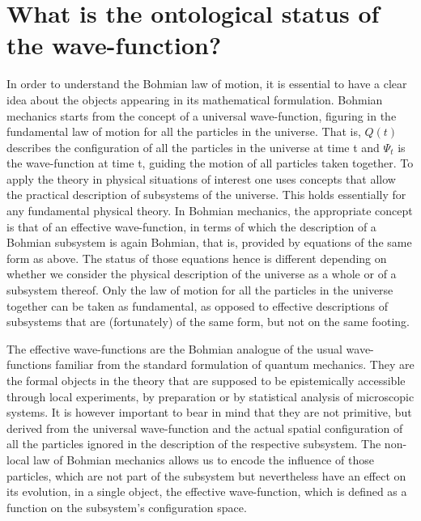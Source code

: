 \documentclass[12pt]{article}
\theoremstyle{definition}
\begin{document}
\section{What is the ontological status of the wave-function?}
In order to understand the Bohmian law of motion, it is essential to have a clear idea about the objects appearing in its mathematical formulation. Bohmian mechanics starts from the concept of a universal wave-function, figuring in the fundamental law of motion for all the particles in the universe. That is, $Q(t)$ describes the configuration of all the particles in the universe at time t and $\Psi_t$ is the wave-function at time t, guiding the motion of all particles taken together. To apply the theory in physical situations of interest one uses concepts that allow the practical description of subsystems of the universe. This holds essentially for any fundamental physical theory. In Bohmian mechanics, the appropriate concept is that of an effective wave-function, in terms of which the description of a Bohmian subsystem is again Bohmian, that is, provided by equations of the same form as above. The status of those equations hence is different depending on whether we consider the physical description of the universe as a whole or of a subsystem thereof. Only the law of motion for all the particles in the universe together can be taken as fundamental, as opposed to effective descriptions of subsystems that are (fortunately) of the same form, but not on the same footing.

The effective wave-functions are the Bohmian analogue of the usual wave-functions familiar from the standard formulation of quantum mechanics. They are the formal objects in the theory that are supposed to be epistemically accessible through local experiments, by preparation or by statistical analysis of microscopic systems. It is however important to bear in mind that they are not primitive, but derived from the universal wave-function and the actual spatial configuration of all the particles ignored in the description of the respective subsystem. The non-local law of Bohmian mechanics allows us to encode the influence of those particles, which are not part of the subsystem but nevertheless have an effect on its evolution, in a single object, the effective wave-function, which is defined as a function on the subsystem's configuration space.
\end{document}
